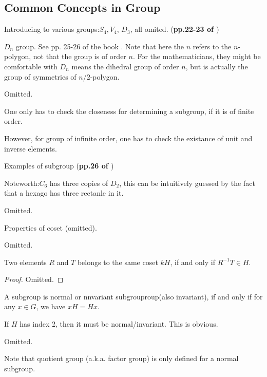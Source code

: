 
\subsection{Common Concepts in Group}
\label{sec:Common-Concepts-in-Group}

Introducing to various groups:$S_4, V_4$, $D_3$, all omited.
(\textbf{pp.22-23 of \cite{book}})

$D_n$ group. See pp. 25-26 of the book \cite{book}.
Note that here the $n$ refers to the $n$-polygon, not that the group is
of order $n$. For the mathematicians, they might be comfortable with
$D_n$ means the dihedral group of order $n$, but is actually the group of
symmetries of $n/2$-polygon.

\begin{defi}[Subgroup]
    Omitted.
\end{defi}
\begin{fact}
    One only has to check the closeness for determining a subgroup, if it
    is of finite order.

    However, for group of infinite order, one has to check the existance
    of unit and inverse elements.
\end{fact}
Examples of subgroup (\textbf{pp.26 of \cite{book}})

Noteworth:$C_6$ has three copies of $D_2$, this can be intuitively 
guessed by the fact that a hexago has three rectanle in it.

\begin{defi}[Coset]
    Omitted.
\end{defi}
Properties of coset (omitted).

\begin{defi}
    Omitted.
\end{defi}

\begin{prop}
    Two elements $R$ and $T$ belongs to the same coset $kH$, if and only
    if $R^{-1}T\in H$.
\end{prop}
\begin{proof}
    Omitted.
\end{proof}
\begin{defi}
    A subgroup is normal or nnvariant subgrouproup(also invariant), if
    and only if for any $x\in G$, we have $xH = Hx$.
\end{defi}
\begin{fact}
    If $H$ has index 2, then it must be normal/invariant. This is
    obvious.
\end{fact}
\begin{defi}[Quotient]
    Omitted.
\end{defi}
Note that quotient group (a.k.a. factor group) is only defined for a normal subgroup.

